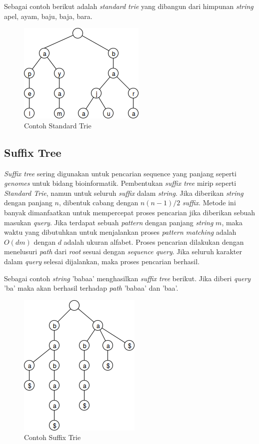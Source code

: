 Sebagai contoh berikut adalah \textit{standard trie} yang dibangun dari himpunan \textit{string} {apel, ayam, baju, baja, bara}.
\begin{figure}
    \centering
    \includegraphics[scale=0.6]{pics/Contoh-StandardTrie}
    \caption{Contoh Standard Trie}
    \label{fig:contoh-standard-trie}
\end{figure}

\subsection{Suffix Tree}
\textit{Suffix tree} sering digunakan untuk pencarian sequence yang panjang seperti \textit{genomes} untuk bidang bioinformatik. Pembentukan \textit{suffix tree} mirip seperti \textit{Standard Trie}, namun untuk seluruh \textit{suffix} dalam \textit{string}. Jika diberikan \textit{string} dengan panjang $n$, dibentuk cabang dengan $n(n-1)/2$ \textit{suffix}.  Metode ini banyak dimanfaatkan untuk mempercepat proses pencarian jika diberikan sebuah masukan \textit{query}. Jika terdapat sebuah \textit{pattern} dengan panjang \textit{string} $m$, maka waktu yang dibutuhkan untuk menjalankan proses \textit{pattern matching} adalah $O(dm)$ dengan $d$ adalah ukuran alfabet. Proses pencarian dilakukan dengan menelusuri \textit{path} dari \textit{root} sesuai dengan \textit{sequence query}. Jika seluruh karakter dalam \textit{query} selesai dijalankan, maka proses pencarian berhasil. 

Sebagai contoh \textit{string} 'babaa' menghasilkan \textit{suffix tree} berikut. Jika diberi \textit{query} 'ba' maka akan berhasil terhadap \textit{path} 'babaa' dan 'baa'.
\begin{figure}
    \centering
    \includegraphics[scale=0.6]{pics/Contoh-SuffixTree}
    \caption{Contoh Suffix Trie}
    \label{fig:contoh-suffix-trie}
\end{figure}


